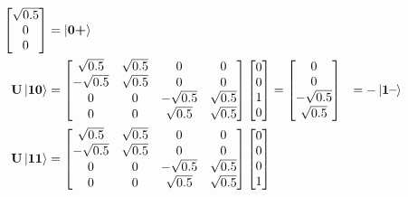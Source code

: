 \begin{figure}[H]
\begin{alignat*}{2}
\begin{bmatrix}
            \sqrt{0.5}   \\
            0            \\
            0            \\
        \end{bmatrix}&=\ket{\mathbf{0}\textbf{+}}\\
        \mathbf{U}\ket{\mathbf{1}\mathbf{0}}&=
        \begin{bmatrix}
            \sqrt{0.5}  &  \sqrt{0.5}   & 0             & 0          \\
            -\sqrt{0.5} &  \sqrt{0.5}   & 0             & 0          \\
            0           & 0             & -\sqrt{0.5}   & \sqrt{0.5} \\
            0           & 0             & \sqrt{0.5}    & \sqrt{0.5} \\
        \end{bmatrix}
        \begin{bmatrix}
            0 \\
            0 \\
            1 \\
            0 \\
        \end{bmatrix}
        =
        \begin{bmatrix}
            0            \\
            0            \\
            -\sqrt{0.5}  \\
            \sqrt{0.5}   \\
        \end{bmatrix}&=-\ket{\mathbf{1}\textbf{--}} \\
        \mathbf{U}\ket{\mathbf{1}\mathbf{1}}&=
        \begin{bmatrix}
            \sqrt{0.5}  &  \sqrt{0.5}   & 0             & 0          \\
            -\sqrt{0.5} &  \sqrt{0.5}   & 0             & 0          \\
            0           & 0             & -\sqrt{0.5}   & \sqrt{0.5} \\
            0           & 0             & \sqrt{0.5}    & \sqrt{0.5} \\
        \end{bmatrix}
        \begin{bmatrix}
            0 \\
            0 \\
            0 \\
            1 \\

\end{bmatrix}
\end{alignat*}
\end{figure}

